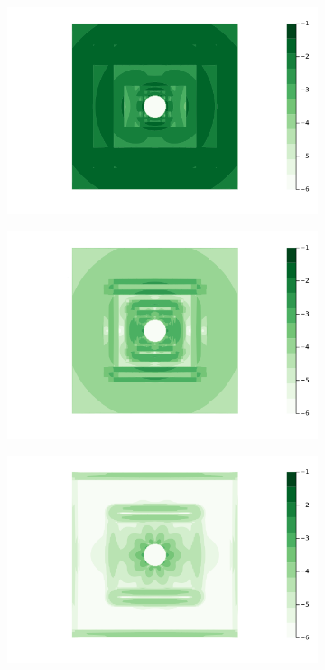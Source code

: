 \documentclass[preprint,12pt]{elsarticle}
\begin{document}
\begin{figure}
\begin{subfigure}{.5\textwidth}
  \centering
  \includegraphics[width=\linewidth]{tex/fig/lamb_dipole_error_dist2.png}
  \caption{}
\end{subfigure}%
\begin{subfigure}{.5\textwidth}
  \centering
  \includegraphics[width=\linewidth]{tex/fig/lamb_dipole_error_dist8.png}
  \caption{}
\end{subfigure}
\begin{subfigure}{.5\textwidth}
  \centering
  \includegraphics[width=\linewidth]{tex/fig/lamb_dipole_error_dist32.png}

\end{subfigure}
\end{figure}
\end{document}
